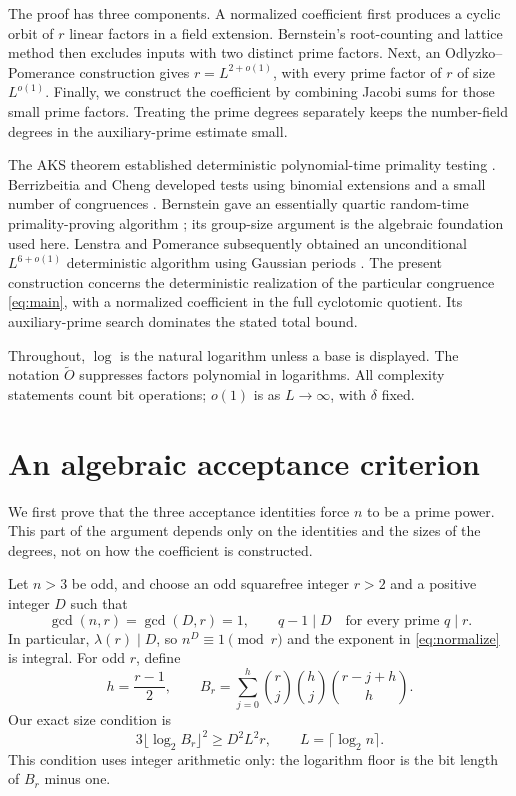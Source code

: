 \documentclass[11pt]{article}
\theoremstyle{definition}
\theoremstyle{remark}
\newcommand{\softO}{\widetilde O}
\begin{document}
The proof has three components. A normalized coefficient first produces
a cyclic orbit of $r$ linear factors in a field extension. Bernstein's
root-counting and lattice method \cite{bernstein} then excludes inputs
with two distinct prime factors. Next, an Odlyzko--Pomerance construction
gives $r=L^{2+o(1)}$, with every prime factor of $r$ of size $L^{o(1)}$.
Finally, we construct the coefficient by combining Jacobi sums for those
small prime factors. Treating the prime degrees separately keeps the
number-field degrees in the auxiliary-prime estimate small.

The AKS theorem established deterministic polynomial-time primality
testing \cite{aks}. Berrizbeitia and Cheng developed tests using
binomial extensions and a small number of congruences
\cite{berrizbeitia,cheng}. Bernstein gave an essentially quartic
random-time primality-proving algorithm \cite{bernstein}; its
group-size argument is the algebraic foundation used here.
Lenstra and Pomerance subsequently obtained an unconditional
$L^{6+o(1)}$ deterministic algorithm using Gaussian periods
\cite{lenstra-pomerance}. The present construction concerns the
deterministic realization of the particular congruence
\eqref{eq:main}, with a normalized coefficient in the full cyclotomic
quotient. Its auxiliary-prime search dominates the stated total bound.

Throughout, $\log$ is the natural logarithm unless a base is displayed.
The notation $\softO$ suppresses factors polynomial in logarithms.
All complexity statements count bit operations; $o(1)$ is as
$L\to\infty$, with $\delta$ fixed.

\section{An algebraic acceptance criterion}\label{sec:criterion}

We first prove that the three acceptance identities force $n$ to be
a prime power. This part of the argument depends only on the identities
and the sizes of the degrees, not on how the coefficient is constructed.

Let $n>3$ be odd, and choose an odd squarefree integer $r>2$ and a
positive integer $D$ such that
\begin{equation}\label{eq:degrees}
 \gcd(n,r)=\gcd(D,r)=1,\qquad q-1\mid D
       \quad\text{for every prime }q\mid r.
\end{equation}
In particular, $\lambda(r)\mid D$, so $n^D\equiv1\pmod r$ and the
exponent in \eqref{eq:normalize} is integral. For odd $r$, define
\begin{equation}\label{eq:B}
 h=\frac{r-1}{2},\qquad
 B_r=\sum_{j=0}^{h}\binom rj\binom hj\binom{r-j+h}{h}.
\end{equation}
Our exact size condition is
\begin{equation}\label{eq:size}
 3\bigl\lfloor\log_2 B_r\bigr\rfloor^2\ge D^2L^2r,
 \qquad L=\lceil\log_2 n\rceil.
\end{equation}
This condition uses integer arithmetic only: the logarithm floor is
the bit length of $B_r$ minus one.
\end{document}
